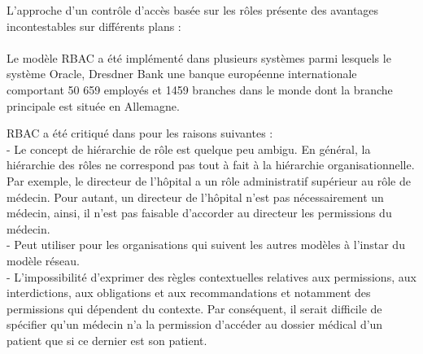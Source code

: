 \label{sectionAvantageRBAC}

L'approche d'un contrôle d'accès basée sur les rôles présente des avantages incontestables sur différents plans \cite{theseBenoit}:



\paragraph{} Le modèle RBAC a été implémenté dans plusieurs systèmes parmi lesquels le système Oracle, Dresdner Bank une banque européenne internationale comportant 50 659 employés et 1459 branches dans le monde dont la branche principale est située en Allemagne.

\label{sectionInconvéniantRBAC}

RBAC a été critiqué dans \cite{abou03} pour les raisons suivantes :\\
- Le concept de hiérarchie de rôle est quelque peu ambigu. En général, la hiérarchie des rôles ne correspond pas tout à fait à la hiérarchie organisationnelle. Par exemple, le directeur de l'hôpital a un rôle administratif supérieur au rôle de médecin. Pour autant, un directeur de l'hôpital n'est pas nécessairement un médecin, ainsi, il n'est pas faisable d'accorder au directeur les permissions du médecin.\\
- Peut utiliser pour les organisations qui suivent les autres modèles à l'instar du modèle réseau. \\
- L'impossibilité d'exprimer des règles contextuelles relatives aux permissions, aux interdictions, aux obligations et aux recommandations et notamment des permissions qui dépendent du contexte. Par conséquent, il serait difficile de spécifier qu'un médecin n'a la permission d'accéder au dossier médical d'un patient que si ce dernier est son patient.

